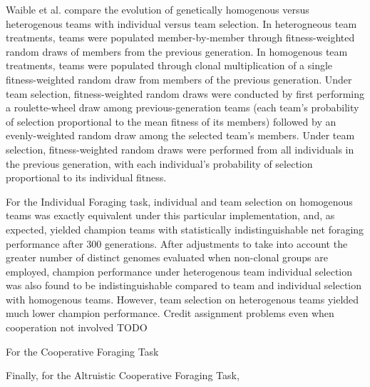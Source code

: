 Waible et al. compare the evolution of genetically homogenous versus heterogenous teams with individual versus team selection.
In heterogneous team treatments, teams were populated member-by-member through fitness-weighted random draws of members from the previous generation.
In homogenous team treatments, teams were populated through clonal multiplication of a single fitness-weighted random draw from members of the previous generation.
Under team selection, fitness-weighted random draws were conducted by first performing a roulette-wheel draw among previous-generation teams (each team's probability of selection proportional to the mean fitness of its members) followed by an evenly-weighted random draw among the selected team's members.
Under team selection, fitness-weighted random draws were performed from all individuals in the previous generation, with each individual's probability of selection proportional to its individual fitness.

For the Individual Foraging task, individual and team selection on homogenous teams was exactly equivalent under this particular implementation, and, as expected, yielded champion teams with statistically indistinguishable net foraging performance after 300 generations.
After adjustments to take into account the greater number of distinct genomes evaluated when non-clonal groups are employed, champion performance under heterogenous team individual selection was also found to be indistinguishable compared to team and individual selection with homogenous teams.
However, team selection on heterogenous teams yielded much lower champion performance.
Credit assignment problems even when cooperation not involved TODO

For the Cooperative Foraging Task

Finally, for the Altruistic Cooperative Foraging Task,
